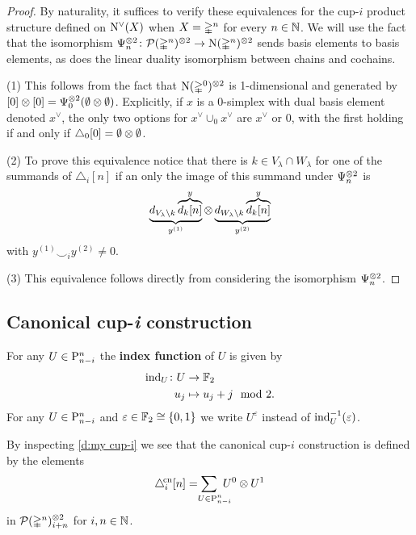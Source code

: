 \begin{proof}
	By naturality, it suffices to verify these equivalences for the \mbox{cup-$i$} product structure defined on $\operatorname{N^{\vee}}(X)$ when $X = \mathbb{\Delta}^n$ for every $n \in \mathbb{N}$.
	We will use the fact that the isomorphism $\Psi_n^{\otimes 2} \colon \mathcal{P}(\mathbb{\Delta}^n)^{\otimes 2} \to \operatorname{N}(\mathbb{\Delta}^n)^{\otimes 2}$ sends basis elements to basis elements, as does the linear duality isomorphism between chains and cochains.

	\noindent (1) This follows from the fact that $\operatorname{N}(\mathbb{\Delta}^0)^{\otimes 2}$ is 1-dimensional and generated by $[0] \otimes [0] = \Psi_0^{\otimes 2} (\emptyset \otimes \emptyset)$.
	Explicitly, if $x$ is a $0$-simplex with dual basis element denoted $x^\vee$, the only two options for $x^\vee \cup_0 x^\vee$ are $x^\vee$ or $0$, with the first holding if and only if $\triangle_0[0] = \emptyset \otimes \emptyset$.

	\noindent (2) To prove this equivalence notice that there is $k \in V_\lambda \cap W_\lambda$ for one of the summands of $\triangle_i [n]$ if an only the image of this summand under $\Psi_n^{\otimes 2}$ is
	\[
	\underbrace{d_{V_\lambda \setminus k} \overbrace{d_k[n]}^{y}}_{y^{(1)}}
	\otimes
	\underbrace{d_{W_\lambda \setminus k} \overbrace{d_k[n]}^{y}}_{y^{(2)}}
	\]
	with $y^{(1)} \smallsmile_i y^{(2)} \neq 0$.

	\noindent (3) This equivalence follows directly from considering the isomorphism $\Psi_n^{\otimes 2}$.
\end{proof}

\subsection{Canonical cup-\textit{i} construction}

For any $U \in \mathrm{P}^n_{n-i}$ the \textbf{index function} of $U$ is given by
\[
\begin{split}
	\operatorname{ind}_U \colon U &\to {\mathbb{F}_2} \\
	u_j &\mapsto u_j + j \mod 2.
\end{split}
\]
For any $U \in \mathrm{P}^n_{n-i}$ and $\varepsilon \in {\mathbb{F}_2} \cong \{0,1\}$ we write $U^\varepsilon$ instead of $\operatorname{ind}_U^{-1}(\varepsilon)$.

By inspecting \cref{d:my cup-i} we see that the canonical \mbox{cup-$i$} construction is defined by the elements
\[
\canonical_i[n] =
\sum_{\mathclap{\quad U \in \rP^n_{n-i}}} \ U^0 \ot U^1
\]
in $\mathcal{P}(\mathbb{\Delta}^n)^{\otimes 2}_{i+n}$ for $i,n \in \mathbb{N}$.

